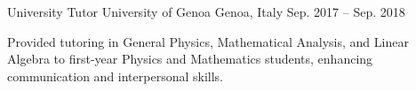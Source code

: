 \begin{cventries}

\cventry
{University Tutor} %
{University of Genoa} %
{Genoa, Italy} %
{Sep. 2017 -- Sep. 2018} %
{ %
\begin{cvitems}
  \item {Provided tutoring in General Physics, Mathematical Analysis, and Linear Algebra to first-year Physics and Mathematics students, enhancing communication and interpersonal skills.}
\end{cvitems}
}


\end{cventries}
